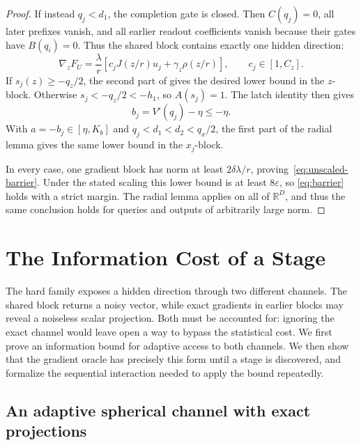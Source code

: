 \documentclass[11pt]{article}
\newcommand{\R}{\mathbb R}
\newcommand{\eps}{\varepsilon}
\theoremstyle{definition}
\theoremstyle{remark}
\begin{document}
\begin{proof}
If instead $q_j<d_1$, the completion gate is closed. Then $C(q_j)=0$,
all later prefixes vanish, and
all earlier readout coefficients vanish because their gates have $B(q_i)=0$.
Thus the shared block contains exactly one hidden direction:
\begin{equation}\label{eq:z-block-gradient}
 \nabla_zF_U
 =\frac\lambda r\left[c_jJ(z/r)u_j
                 +\gamma_z\rho(z/r)\right],
 \qquad c_j\in[1,C_z].
\end{equation}
If $s_j(z)\ge-q_z/2$, the second part of
 gives the desired lower bound in the $z$-block.
Otherwise $s_j<-q_z/2<-h_1$, so $A(s_j)=1$.  The latch identity then gives
\[
 b_j=V'(q_j)-\eta\le-\eta.
\]
With $a=-b_j\in[\eta,K_b]$ and
$q_j<d_1<d_2<q_x/2$, the first part of the radial lemma gives the same lower
bound in the $x_j$-block.

In every case, one gradient block has norm at least
$2\delta\lambda/r$, proving~\eqref{eq:unscaled-barrier}. Under the
stated scaling this lower bound is at least $8\eps$, so
\eqref{eq:barrier} holds with a strict margin. The radial lemma applies on
all of $\R^D$, and thus the same conclusion holds for queries and outputs
of arbitrarily large norm.
\end{proof}

\section{The Information Cost of a Stage}\label{sec:information}

The hard family exposes a hidden direction through two different channels.
The shared block returns a noisy vector, while exact gradients in earlier
blocks may reveal a noiseless scalar projection.  Both must be accounted for:
ignoring the exact channel would leave open a way to bypass the statistical
cost.  We first prove an information bound for adaptive access to both
channels.  We then show that the gradient oracle has precisely this form
until a stage is discovered, and formalize the sequential interaction needed
to apply the bound repeatedly.

\subsection{An adaptive spherical channel with exact projections}
\end{document}

